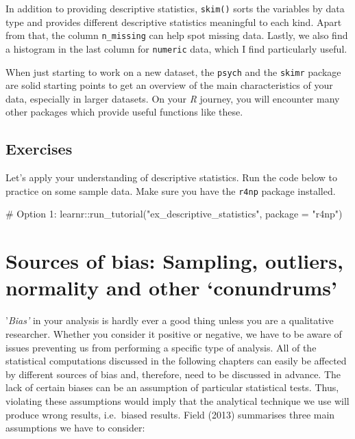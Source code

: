 \documentclass[
  letterpaper,
  DIV=11,
  numbers=noendperiod]{scrreprt}
\newenvironment{Shaded}{\begin{snugshade}}{\end{snugshade}}
\newcommand{\AttributeTok}[1]{\textcolor[rgb]{0.40,0.45,0.13}{#1}}
\newcommand{\CommentTok}[1]{\textcolor[rgb]{0.37,0.37,0.37}{#1}}
\newcommand{\FunctionTok}[1]{\textcolor[rgb]{0.28,0.35,0.67}{#1}}
\newcommand{\NormalTok}[1]{\textcolor[rgb]{0.00,0.23,0.31}{#1}}
\newcommand{\SpecialCharTok}[1]{\textcolor[rgb]{0.37,0.37,0.37}{#1}}
\newcommand{\StringTok}[1]{\textcolor[rgb]{0.13,0.47,0.30}{#1}}
\begin{document}
In addition to providing descriptive statistics, \texttt{skim()} sorts
the variables by data type and provides different descriptive statistics
meaningful to each kind. Apart from that, the column \texttt{n\_missing}
can help spot missing data. Lastly, we also find a histogram in the last
column for \texttt{numeric} data, which I find particularly useful.

When just starting to work on a new dataset, the \texttt{psych} and the
\texttt{skimr} package are solid starting points to get an overview of
the main characteristics of your data, especially in larger datasets. On
your \emph{R} journey, you will encounter many other packages which
provide useful functions like these.

\section{Exercises}\label{sec-exercises-descriptive-statistics}

Let's apply your understanding of descriptive statistics. Run the code
below to practice on some sample data. Make sure you have the
\texttt{r4np} package installed.

\begin{Shaded}
\begin{Highlighting}[]
\CommentTok{\# Option 1:}
\NormalTok{learnr}\SpecialCharTok{::}\FunctionTok{run\_tutorial}\NormalTok{(}\StringTok{"ex\_descriptive\_statistics"}\NormalTok{, }\AttributeTok{package =} \StringTok{"r4np"}\NormalTok{)}
\end{Highlighting}
\end{Shaded}


\chapter{Sources of bias: Sampling, outliers, normality and other
`conundrums'}\label{sec-sources-of-bias}

'\emph{Bias'} in your analysis is hardly ever a good thing unless you
are a qualitative researcher. Whether you consider it positive or
negative, we have to be aware of issues preventing us from performing a
specific type of analysis. All of the statistical computations discussed
in the following chapters can easily be affected by different sources of
bias and, therefore, need to be discussed in advance. The lack of
certain biases can be an assumption of particular statistical tests.
Thus, violating these assumptions would imply that the analytical
technique we use will produce wrong results, i.e.~biased results. Field
(2013) summarises three main assumptions we have to consider:
\end{document}
